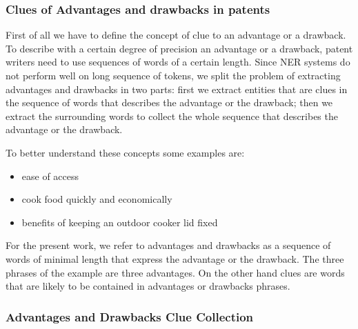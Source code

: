 \documentclass[]{book}
\begin{document}
\subsubsection{Clues of Advantages and drawbacks in
patents}\label{clues-of-advantages-and-drawbacks-in-patents}

First of all we have to define the concept of clue to an advantage or a
drawback. To describe with a certain degree of precision an advantage or
a drawback, patent writers need to use sequences of words of a certain
length. Since NER systems do not perform well on long sequence of
tokens, we split the problem of extracting advantages and drawbacks in
two parts: first we extract entities that are clues in the sequence of
words that describes the advantage or the drawback; then we extract the
surrounding words to collect the whole sequence that describes the
advantage or the drawback.

To better understand these concepts some examples are:

\begin{itemize}
\item
   ease of access
\item
  cook food quickly and economically
\item
  benefits of keeping an outdoor cooker lid fixed
\end{itemize}

For the present work, we refer to advantages and drawbacks as a sequence
of words of minimal length that express the advantage or the drawback.
The three phrases of the example are three advantages. On the other hand
clues are words that are likely to be contained in advantages or
drawbacks phrases.

\subsubsection{Advantages and Drawbacks Clue
Collection}\label{adv-drw-article-sourc}
\end{document}

